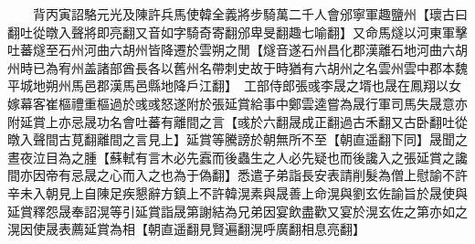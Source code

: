 　　背丙寅詔駱元光及陳許兵馬使韓全義將步騎萬二千人會邠寧軍趣鹽州【瓌古曰翻吐從暾入聲將即亮翻又音如字騎奇寄翻邠卑旻翻趣七喻翻】又命馬燧以河東軍擊吐蕃燧至石州河曲六胡州皆降遷於雲朔之閒【燧音遂石州昌化郡漢離石地河曲六胡州時已為宥州盖諸部酋長各以舊州名帶刺史故于時猶有六胡州之名雲州雲中郡本魏平城地朔州馬邑郡漢馬邑縣地降戶江翻】　工部侍郎張彧李晟之壻也晟在鳳翔以女嫁幕客崔樞禮重樞過於彧彧怒遂附於張延賞給事中鄭雲逵嘗為晟行軍司馬失晟意亦附延賞上亦忌晟功名會吐蕃有離間之言【彧於六翻晟成正翻過古禾翻又古卧翻吐從暾入聲間古莧翻離間之言見上】延賞等騰謗於朝無所不至【朝直遥翻下同】晟聞之晝夜泣目為之腫【蘇軾有言木必先蠧而後蟲生之人必先疑也而後讒入之張延賞之讒間亦因帝有忌晟之心而入之也為于偽翻】悉遣子弟詣長安表請削髮為僧上慰諭不許辛未入朝見上自陳足疾懇辭方鎮上不許韓滉素與晟善上命滉與劉玄佐諭旨於晟使與延賞釋怨晟奉詔滉等引延賞詣晟第謝結為兄弟因宴飲盡歡又宴於滉玄佐之第亦如之滉因使晟表薦延賞為相【朝直遥翻見賢遍翻滉呼廣翻相息亮翻】

